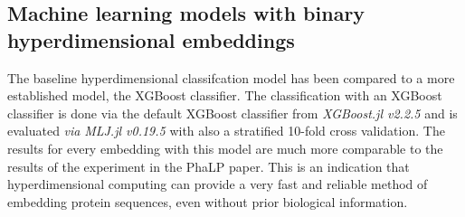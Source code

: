 \subsection*{Machine learning models with binary hyperdimensional embeddings}
The baseline hyperdimensional classifcation model has been compared to a more established model, the XGBoost classifier. The classification with an XGBoost classifier is done via the default XGBoost classifier from \textit{XGBoost.jl v2.2.5} and is evaluated \textit{via} \textit{MLJ.jl v0.19.5} with also a stratified 10-fold cross validation. The results for every embedding with this model are much more comparable to the results of the experiment in the PhaLP paper. This is an indication that hyperdimensional computing can provide a very fast and reliable method of embedding protein sequences, even without prior biological information.